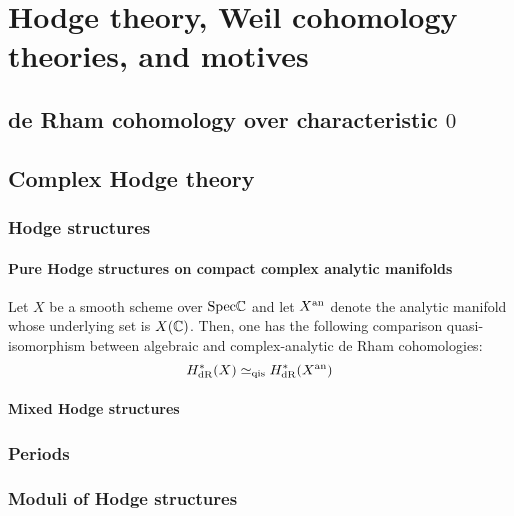 \chapter{Hodge theory, Weil cohomology theories, and motives}
    \begin{abstract}
        
    \end{abstract}
    
    \minitoc
    
    \section{de Rham cohomology over characteristic \texorpdfstring{$0$}{}} \label{section: algebraic_de_rham_cohomology_over_characteristic_0}
    
    \section{Complex Hodge theory}
        \subsection{Hodge structures}
            \subsubsection{Pure Hodge structures on compact complex analytic manifolds}
                \begin{theorem} \label{theorem: de_rham_cohomology}
                    Let $X$ be a smooth scheme over $\mathrm{Spec} \mathbb{C}$ and let $X^{\mathrm{an}}$ denote the analytic manifold whose underlying set is $X(\mathbb{C})$. Then, one has the following comparison quasi-isomorphism between algebraic and complex-analytic de Rham cohomologies:
                        $$H^*_{\mathrm{dR}}(X) \simeq_{\mathrm{qis}} H^*_{\mathrm{dR}}(X^{\mathrm{an}})$$
                \end{theorem}
            
            \subsubsection{Mixed Hodge structures}
        
        \subsection{Periods}
        
        \subsection{Moduli of Hodge structures}
    
